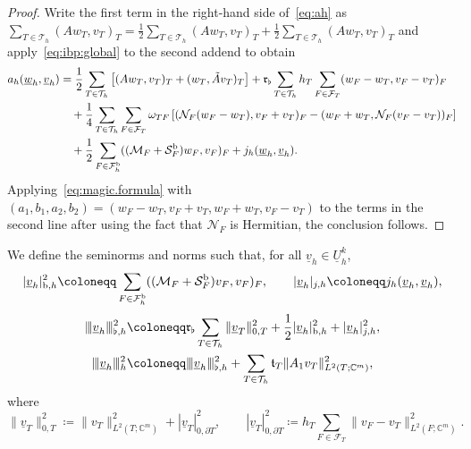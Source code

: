 \documentclass[11pt,a4paper]{article}
\theoremstyle{plain}
\theoremstyle{remark}
\theoremstyle{definition}
\newcommand{\Complex}{\mathbb{C}}
\newcommand{\Th}{\mathcal{T}_h}
\newcommand{\Fhb}{\mathcal{F}_h^{\rm b}}
\newcommand{\FT}{\mathcal{F}_T}
\newcommand{\Uh}{\underline{U}_h^k}
\newcommand{\norm}[2]{\|#2\|_{#1}}
\newcommand{\seminorm}[2]{|#2|_{#1}}
\newcommand{\tnorm}[2]{|\kern-0.25ex|\kern-0.25ex|#2|\kern-0.25ex|\kern-0.25ex|_{#1}}
\newcommand{\tref}{\mathfrak{t}_T}
\newcommand{\Kmin}{\mathfrak{r}_\flat}
\begin{document}
\begin{proof}
  Write the first term in the right-hand side of~\eqref{eq:ah} as $\sum_{T \in \Th} (A w_T, v_T)_T = \frac12 \sum_{T \in \Th} (A w_T, v_T)_T + \frac12 \sum_{T \in \Th} (A w_T, v_T)_T$ and apply~\eqref{eq:ibp:global} to the second addend to obtain
  \[
  \begin{aligned}
    a_h(\underline{w}_h, \underline{v}_h)
    &=
    \frac12 \sum_{T \in \Th} \left[
      (A w_T, v_T)_T
      + (w_T, \tilde{A} v_T)_T
      \right]
    + \Kmin \sum_{T \in \Th} h_T \sum_{F \in \FT} (w_F - w_T, v_F - v_T)_F
    \\
    &\quad
    + \frac14 \sum_{T \in \Th} \sum_{F \in \FT} \omega_{TF} \left[
      (\mathcal{N}_F(w_F - w_T), v_F + v_T)_F
      - (w_F + w_T, \mathcal{N}_F (v_F - v_T))_F
      \right]
    \\
    &\quad
    + \frac12 \sum_{F \in \Fhb} ((\mathcal{M}_F + \mathcal{S}_F^{\rm b}) w_F, v_F)_F
    + j_h(\underline{w}_h, \underline{v}_h).
  \end{aligned}
  \]
  Applying~\eqref{eq:magic.formula} with $(a_1,b_1,a_2,b_2) = \left(w_F - w_T, v_F + v_T, w_F + w_T, v_F - v_T\right)$ to the terms in the second line after using the fact that $\mathcal{N}_F$ is Hermitian, the conclusion follows.
\end{proof}

We define the seminorms and norms such that, for all $\underline{v}_h \in \Uh$,
\begin{equation}\label{eq:seminorm.S.b}
  \seminorm{{\rm b},h}{\underline{v}_h}^2
  \coloneqq
  \sum_{F \in \Fhb} ((\mathcal{M}_F + \mathcal{S}_F^{\rm b}) v_F, v_F)_F,
  \qquad
  \seminorm{j,h}{\underline{v}_h}
  \coloneqq j_h(\underline{v}_h, \underline{v}_h),
\end{equation}
\begin{equation}\label{eq:tnorm.h}
  \begin{aligned}
    \tnorm{\flat,h}{\underline{v}_h}^2
    &\coloneqq \Kmin \sum_{T \in \Th} \norm{0,T}{\underline{v}_T}^2
    + \frac12 \seminorm{{\rm b},h}{\underline{v}_h}^2
    + \seminorm{j,h}{\underline{v}_h}^2,
    \\
    \tnorm{h}{\underline{v}_h}^2
    &\coloneqq
    \tnorm{\flat,h}{\underline{v}_h}^2
    + \sum_{T \in \Th} \tref \norm{L^2(T;\Complex^m)}{A_1 v_T}^2,
  \end{aligned}
\end{equation}
where
\begin{equation}\label{eq:norm.0.T}
  \norm{0,T}{\underline{v}_T}^2
  \coloneqq
  \norm{L^2(T;\Complex^m)}{v_T}^2
  + \seminorm{0,\partial T}{\underline{v}_T}^2,
  \qquad
  \seminorm{0,\partial T}{\underline{v}_T}^2
  \coloneqq h_T \sum_{F \in \FT} \norm{L^2(F;\Complex^m)}{v_F - v_T}^2.
\end{equation}
\end{document}
